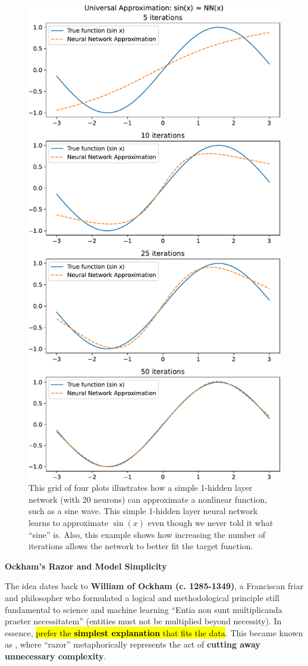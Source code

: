 \begin{figure}[!htp]
    \centering
    \includegraphics[width=.8\textwidth]{img/neural-networks-and-overfitting/universal-approximation-theorem.pdf}
    \caption{This grid of four plots illustrates how a simple 1-hidden layer network (with 20 neurons) can approximate a nonlinear function, such as a sine wave. This simple 1-hidden layer neural network learns to approximate $\sin(x)$ even though we never told it what ``sine'' is. Also, this example shows how increasing the number of iterations allows the network to better fit the target function.}
\end{figure}

\highspace
\begin{flushleft}
    \textcolor{Green3}{ \textbf{Ockham's Razor and Model Simplicity}}
\end{flushleft}
The idea dates back to \textbf{William of Ockham (c. 1285-1349)}, a Franciscan friar and philosopher who formulated a logical and methodological principle still fundamental to science and machine learning ``Entia non sunt multiplicanda praeter necessitatem'' (entities must not be multiplied beyond necessity). In essence, \hl{prefer the \textbf{simplest explanation} that fits the data}. This became known as , where ``razor'' metaphorically represents the act of \textbf{cutting away unnecessary complexity}.

